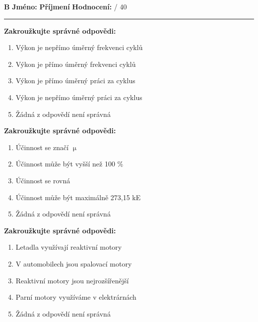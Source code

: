 \documentclass[../main.tex]{subfiles}
\begin{document}
\edef\hmm{\pdfpagewidth=\the\pdfpagewidth \pdfpageheight=\the\pdfpageheight\relax}
\pdfpagewidth=210mm
\pdfpageheight=297mm

\textbf{B}
\hspace{1cm}
\textbf{Jméno:}
\tecky{4cm}
\hspace{0.25cm}
\textbf{Příjmení}
\tecky{4cm}
\hfill
\textbf{Hodnocení:}
\tecky{0.5cm}
{/}
{40}
\vspace{0.25cm}
\hrule
\vspace{0.25cm}

\begin{enumerate}[label={\textbf{\arabic*.}}]
\begin{minipage}{0.45\textwidth}
    \item \textbf{Zakroužkujte správné odpovědi:}
        \begin{enumerate}[label={\alph*)}, itemsep=0pt, topsep=0.15cm]
            \item {Výkon je nepřímo úměrný frekvenci cyklů}
            \item {Výkon je přímo úměrný frekvenci cyklů}
            \item {Výkon je přímo úměrný práci za cyklus}
            \item {Výkon je nepřímo úměrný práci za cyklus}
            \item {Žádná z odpovědí není správná}
        \end{enumerate}

    \item \textbf{Zakroužkujte správné odpovědi:}
        \begin{enumerate}[label={\alph*)}, itemsep=0pt, topsep=0.15cm]
            \item {Účinnost se značí \(\upmu\)}
            \item {Účinnost může být vyšší než 100 \%}
            \item {Účinnost se rovná }
            \item {Účinnost může být maximálně 273,15 kE}
            \item {Žádná z odpovědí není správná}
        \end{enumerate}

    \item \textbf{Zakroužkujte správné odpovědi:}
        \begin{enumerate}[label={\alph*)}, itemsep=0pt, topsep=0.15cm]
            \item {Letadla využívají reaktivní motory}
            \item {V automobilech jsou spalovací motory}
            \item {Reaktivní motory jsou nejrozšířenější}
            \item {Parní motory využíváme v elektrárnách}
            \item {Žádná z odpovědí není správná}
        \end{enumerate}


\end{minipage}
\end{enumerate}
\end{document}
